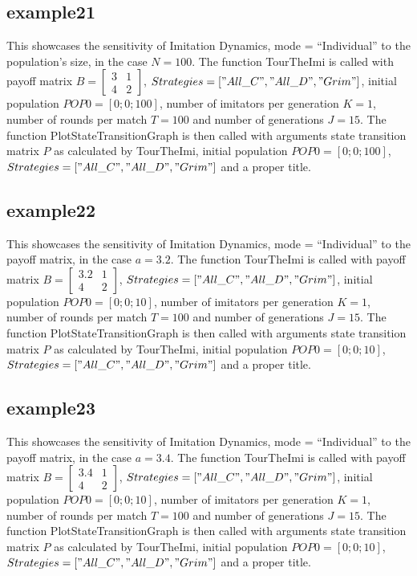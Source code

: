 \subsection{example21}
This showcases the sensitivity of Imitation Dynamics, mode = ``Individual'' to the population's size, in the case $N=100$. The function TourTheImi is called with payoff matrix $B = \begin{bmatrix} 3 & 1 \\ 4 & 2 \end{bmatrix}$, $Strategies = ["All\_C", "All\_D", "Grim"]$, initial population $POP0 = [0; 0; 100]$, number of imitators per generation $K=1$, number of rounds per match $T = 100$ and number of generations $J = 15$. The function PlotStateTransitionGraph is then called with arguments state transition matrix $P$ as calculated by TourTheImi, initial population $POP0 = [0; 0; 100]$, $Strategies = ["All\_C", "All\_D", "Grim"]$ and a proper title.

\subsection{example22}
This showcases the sensitivity of Imitation Dynamics, mode = ``Individual'' to the payoff matrix, in the case $a = 3.2$. The function TourTheImi is called with payoff matrix $B = \begin{bmatrix} 3.2 & 1 \\ 4 & 2 \end{bmatrix}$, $Strategies = ["All\_C", "All\_D", "Grim"]$, initial population $POP0 = [0; 0; 10]$, number of imitators per generation $K=1$, number of rounds per match $T = 100$ and number of generations $J = 15$. The function PlotStateTransitionGraph is then called with arguments state transition matrix $P$ as calculated by TourTheImi, initial population $POP0 = [0; 0; 10]$, $Strategies = ["All\_C", "All\_D", "Grim"]$ and a proper title.

\subsection{example23}
This showcases the sensitivity of Imitation Dynamics, mode = ``Individual'' to the payoff matrix, in the case $a = 3.4$. The function TourTheImi is called with payoff matrix $B = \begin{bmatrix} 3.4 & 1 \\ 4 & 2 \end{bmatrix}$, $Strategies = ["All\_C", "All\_D", "Grim"]$, initial population $POP0 = [0; 0; 10]$, number of imitators per generation $K=1$, number of rounds per match $T = 100$ and number of generations $J = 15$. The function PlotStateTransitionGraph is then called with arguments state transition matrix $P$ as calculated by TourTheImi, initial population $POP0 = [0; 0; 10]$, $Strategies = ["All\_C", "All\_D", "Grim"]$ and a proper title.

